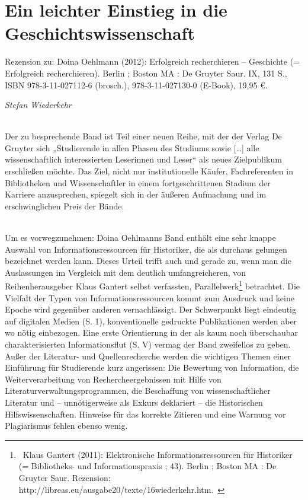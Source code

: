\documentclass[a4paper,
fontsize=11pt,
oneside,
numbers=noperiodatend,
parskip=half-,
bibliography=totoc,
final
]{scrartcl}
\begin{document}
\section*{Ein leichter Einstieg in die Geschichtswissenschaft}

Rezension zu: Doina Oehlmann (2012): Erfolgreich recherchieren --
Geschichte (= Erfolgreich recherchieren). Berlin ; Boston MA : De
Gruyter Saur. IX, 131 S., ISBN 978-3-11-027112-6 (brosch.),
978-3-11-027130-0 (E-Book), 19,95 \euro{}.

 \emph{Stefan Wiederkehr}

\\ Der zu besprechende Band ist Teil einer neuen Reihe, mit der der
Verlag De Gruyter sich „Studierende in allen Phasen des Studiums sowie
{[}\ldots{}{]} alle wissenschaftlich interessierten Leserinnen und
Leser`` als neues Zielpublikum erschließen möchte. Das Ziel, nicht nur
institutionelle Käufer, Fachreferenten in Bibliotheken und
Wissenschaftler in einem fortgeschrittenen Stadium der Karriere
anzusprechen, spiegelt sich in der äußeren Aufmachung und im
erschwinglichen Preis der Bände.

\\ Um es vorwegzunehmen: Doina Oehlmanns Band enthält eine sehr knappe
Auswahl von Informationsressourcen für Historiker, die als durchaus
gelungen bezeichnet werden kann. Dieses Urteil trifft auch und gerade
zu, wenn man die Auslassungen im Vergleich mit dem deutlich
umfangreicheren, von Reihenherausgeber Klaus Gantert selbst verfassten,
Parallelwerk\footnote{~Klaus Gantert (2011): Elektronische
  Informationsressourcen für Historiker (= Bibliotheks- und
  Informationspraxis ; 43). Berlin ; Boston MA : De Gruyter Saur.
  Rezension: http://libreas.eu/ausgabe20/texte/16wiederkehr.htm.~}
betrachtet. Die Vielfalt der Typen von Informationsressourcen kommt zum
Ausdruck und keine Epoche wird gegenüber anderen vernachlässigt. Der
Schwerpunkt liegt eindeutig auf digitalen Medien (S. 1), konventionelle
gedruckte Publikationen werden aber wo nötig einbezogen. Eine erste
Orientierung in der als kaum noch überschaubar charakterisierten
Informationsflut (S. V) vermag der Band zweifellos zu geben. Außer der
Literatur- und Quellenrecherche werden die wichtigen Themen einer
Einführung für Studierende kurz angerissen: Die Bewertung von
Information, die Weiterverarbeitung von Rechercheergebnissen mit Hilfe
von Literaturverwaltungsprogrammen, die Beschaffung von
wissenschaftlicher Literatur und -- unnötigerweise als Exkurs deklariert
-- die Historischen Hilfswissenschaften. Hinweise für das korrekte
Zitieren und eine Warnung vor Plagiarismus fehlen ebenso wenig.
\end{document}
